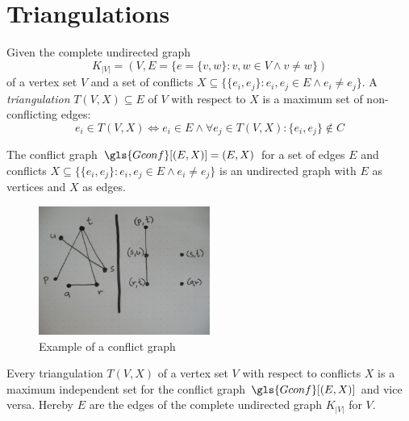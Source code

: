 \chapter{Triangulations}\label{cha:triangulations}


\begin{definition}[Triangulation]
  Given the complete undirected graph
  \[ K_{|V|} = (V,E = \{e=\{v,w\} : v,w \in V \land v\not=w\}) \]
  of a vertex set \(V\) and a set of conflicts \(X \subseteq
  \{\{e_i, e_j\} : e_i,e_j \in E \land e_i \not= e_j\} \).
  A \emph{triangulation} \(T(V,X) \subseteq E\) of \(V\) with respect
  to \(X\) is a maximum set of non-conflicting edges:
  \[
    e_i \in T(V,X)
    \iff e_i \in E
    \land \forall e_j \in T(V,X) : \{e_i,e_j\} \not\in C
  \]
\end{definition}


\begin{definition}\label{def:conflict_graph}
  The conflict graph \(\gls{Gconf}[(E,X)] = (E,X)\) for a set of
  edges \(E\) and conflicts
  \(X \subseteq \{ \{e_i,e_j\} : e_i,e_j \in E \land e_i \not= e_j\}\)
  is an undirected graph with \(E\) as vertices and \(X\) as edges.
\end{definition}

\begin{figure}[ht]
  \centering
  \includegraphics[width=0.5\textwidth]{img/example_conflict_graph.jpg}
  \caption{Example of a conflict graph}
\end{figure}


\begin{theorem}
  \label{thm:triangulation_independent_set}
  Every triangulation \(T(V,X)\) of a vertex set \(V\) with respect
  to conflicts \(X\) is a maximum independent set for the conflict
  graph \(\gls{Gconf}[(E,X)]\) and vice versa. Hereby \(E\) are the
  edges of the complete undirected graph \(K_{|V|}\) for \(V\).
\end{theorem}

